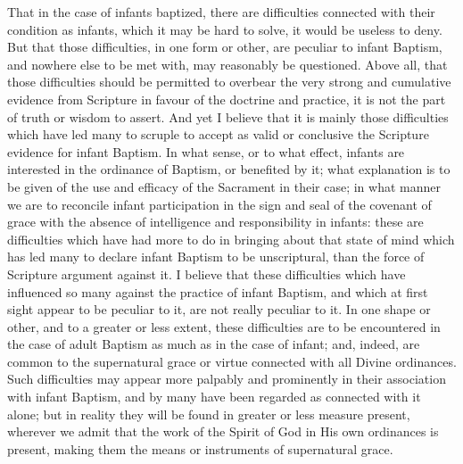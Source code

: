 \documentclass[english,]{book}
\begin{document}
That in the case of infants baptized, there are difficulties connected with their condition as infants, which it may be hard to solve, it would be useless to deny. But that those difficulties, in one form or other, are peculiar to infant Baptism, and nowhere else to be met with, may reasonably be questioned. Above all, that those difficulties should be permitted to overbear the very strong and cumulative evidence from Scripture in favour of the doctrine and practice, it is not the part of truth or wisdom to assert. And yet I believe that it is mainly those difficulties which have led many to scruple to accept as valid or conclusive the Scripture evidence for infant Baptism. In what sense, or to what effect, infants are interested in the ordinance of Baptism, or benefited by it; what explanation is to be given of the use and efficacy of the Sacrament in their case; in what manner we are to reconcile infant participation in the sign and seal of the covenant of grace with the absence of intelligence and responsibility in infants: these are difficulties which have had more to do in bringing about that state of mind which has led many to declare infant Baptism to be unscriptural, than the force of Scripture argument against it. I believe that these difficulties which have influenced so many against the practice of infant Baptism, and which at first sight appear to be peculiar to it, are not really peculiar to it. In one shape or other, and to a greater or less extent, these difficulties are to be encountered in the case of adult Baptism as much as in the case of infant; and, indeed, are common to the supernatural grace or virtue connected with all Divine ordinances. Such difficulties may appear more palpably and prominently in their association with infant Baptism, and by many have been regarded as connected with it alone; but in reality they will be found in greater or less measure present, wherever we admit that the work of the Spirit of God in His own ordinances is present, making them the means or instruments of supernatural grace.
\end{document}
